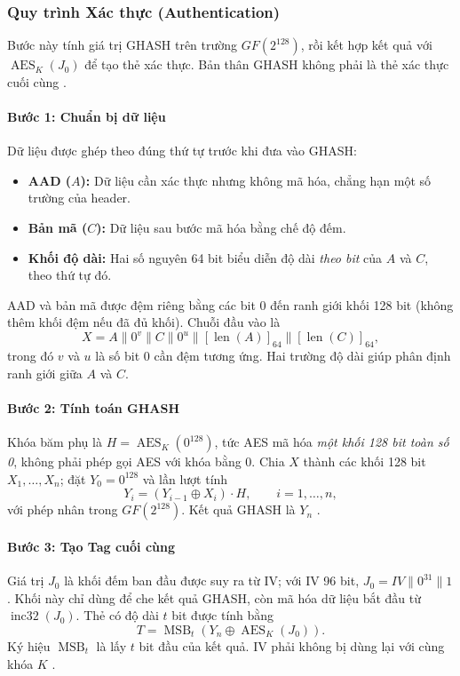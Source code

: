 \subsubsection{Quy trình Xác thực (Authentication)}
Bước này tính giá trị GHASH trên trường $GF(2^{128})$, rồi kết hợp kết quả với $\operatorname{AES}_K(J_0)$ để tạo thẻ xác thực. Bản thân GHASH không phải là thẻ xác thực cuối cùng \cite{gcmnist}.

\paragraph{Bước 1: Chuẩn bị dữ liệu}
Dữ liệu được ghép theo đúng thứ tự trước khi đưa vào GHASH:
\begin{itemize}
    \item \textbf{AAD ($A$):} Dữ liệu cần xác thực nhưng không mã hóa, chẳng hạn một số trường của header.
    \item \textbf{Bản mã ($C$):} Dữ liệu sau bước mã hóa bằng chế độ đếm.
    \item \textbf{Khối độ dài:} Hai số nguyên 64 bit biểu diễn độ dài \emph{theo bit} của $A$ và $C$, theo thứ tự đó.
\end{itemize}
AAD và bản mã được đệm riêng bằng các bit 0 đến ranh giới khối 128 bit (không thêm khối đệm nếu đã đủ khối). Chuỗi đầu vào là
\begin{equation}
    X=A\parallel 0^{v}\parallel C\parallel 0^{u}
      \parallel [\operatorname{len}(A)]_{64}
      \parallel [\operatorname{len}(C)]_{64},
\end{equation}
trong đó $v$ và $u$ là số bit 0 cần đệm tương ứng. Hai trường độ dài giúp phân định ranh giới giữa $A$ và $C$.

\paragraph{Bước 2: Tính toán GHASH}
Khóa băm phụ là $H=\operatorname{AES}_K(0^{128})$, tức AES mã hóa \emph{một khối 128 bit toàn số 0}, không phải phép gọi AES với khóa bằng 0. Chia $X$ thành các khối 128 bit $X_1,\ldots,X_n$; đặt $Y_0=0^{128}$ và lần lượt tính
\begin{equation}
    Y_i=(Y_{i-1}\oplus X_i)\cdot H,\qquad i=1,\ldots,n,
\end{equation}
với phép nhân trong $GF(2^{128})$. Kết quả GHASH là $Y_n$ \cite{gcmnist}.

\paragraph{Bước 3: Tạo Tag cuối cùng}
Giá trị $J_0$ là khối đếm ban đầu được suy ra từ IV; với IV 96 bit, $J_0=IV\parallel 0^{31}\parallel 1$. Khối này chỉ dùng để che kết quả GHASH, còn mã hóa dữ liệu bắt đầu từ $\operatorname{inc32}(J_0)$. Thẻ có độ dài $t$ bit được tính bằng
\begin{equation}
    T=\operatorname{MSB}_{t}\!\left(Y_n\oplus\operatorname{AES}_K(J_0)\right).
\end{equation}
Ký hiệu $\operatorname{MSB}_{t}$ là lấy $t$ bit đầu của kết quả. IV phải không bị dùng lại với cùng khóa $K$ \cite{gcmnist}.

